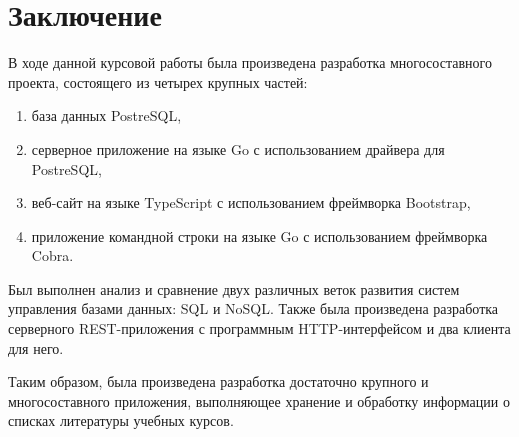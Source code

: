 \section*{Заключение}

В ходе данной курсовой работы была произведена разработка многосоставного проекта, состоящего из четырех крупных частей:

\begin{enumerate}
    \item база данных PostreSQL,
    \item серверное приложение на языке Go с использованием драйвера для PostreSQL,
    \item веб-сайт на языке TypeScript с использованием фреймворка Bootstrap,
    \item приложение командной строки на языке Go с использованием фреймворка Cobra.
\end{enumerate}

Был выполнен анализ и сравнение двух различных веток развития систем управления базами данных: SQL и NoSQL.
Также была произведена разработка серверного REST-приложения с программным HTTP-интерфейсом и два клиента
для него.

Таким образом, была произведена разработка достаточно крупного и многосоставного приложения, выполняющее хранение
и обработку информации о списках литературы учебных курсов.